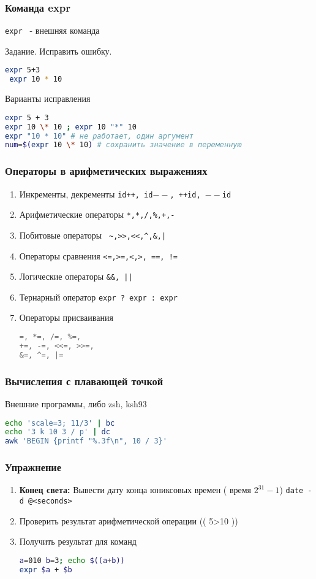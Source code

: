 \begin{frame}[fragile]
  \frametitle{Команда expr}
  {\tt expr } - внешняя команда 
   \begin{block}{Задание. Исправить ошибку.}
        \begin{lstlisting}[language=Bash]
 expr 5+3
 expr 10 * 10
        \end{lstlisting}
   \end{block}
\pause
   \begin{block}{Варианты исправления}
        \begin{lstlisting}[language=Bash]
expr 5 + 3
expr 10 \* 10 ; expr 10 "*" 10
expr "10 * 10" # не работает, один аргумент
num=$(expr 10 \* 10) # сохранить значение в переменную
        \end{lstlisting}
   \end{block}
\end{frame}

\begin{frame}[fragile]
\frametitle{Операторы в арифметических выражениях}
\begin{enumerate}
\item Инкременты, декременты {\tt id++, id$--$, ++id, $--$id } 
\item Арифметические операторы {\tt **,*,/,\%,+,-} 
\item Побитовые операторы {\verb+ ~,>>,<<,^,&,|+}
\item Операторы сравнения {\tt <=,>=,<,>, ==, !=}
\item Логические операторы {\tt \&\&, || } 
\item Тернарный оператор {\tt expr ? expr : expr }
\item Операторы присваивания
\begin{lstlisting}[language=C]
=, *=, /=, %=,
+=, -=, <<=, >>=,
&=, ^=, |=  
\end{lstlisting}
\end{enumerate} 
\end{frame}

\begin{frame}[fragile]
  \frametitle{Вычисления с плавающей точкой}
Внешние программы, либо zsh, ksh93
\begin{lstlisting}[language=Bash]
echo 'scale=3; 11/3' | bc
echo '3 k 10 3 / p' | dc
awk 'BEGIN {printf "%.3f\n", 10 / 3}'
\end{lstlisting}
\end{frame}

\begin{frame}[fragile]
  \frametitle{Упражнение}
 \begin{enumerate}
   \item {\bf Конец света:} Вывести дату конца юниксовых времен ( время $2^{31}-1$) {\tt date -d @<seconds> } 
   \item Проверить результат арифметической операции (( 5>10 ))
   \item Получить результат для команд
\begin{lstlisting}[language=Bash]
a=010 b=3; echo $((a+b)) 
expr $a + $b
\end{lstlisting}
 \end{enumerate}
\end{frame}
